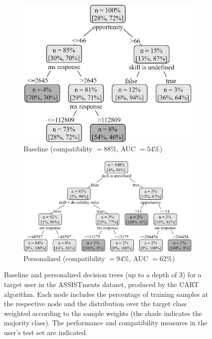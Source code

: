 \documentclass[letterpaper]{article} %
\theoremstyle{definition}
\begin{document}
\begin{figure}[t]
\begin{subfigure}[b]{.4\textwidth}
  \centering
  \includegraphics[width=0.95\linewidth]{assistments_baseline}
  \caption{Baseline (compatibility $=88\%$, AUC $=54\%$)}
  \label{fig:assistments_baseline}
\end{subfigure}
\begin{subfigure}[b]{.6\textwidth}
  \centering
  \includegraphics[width=0.95\linewidth]{assistments_personalized}  
  \caption{Personalized (compatibility $=94\%$, AUC $=62\%$)}
  \label{fig:assistments_personalized}
\end{subfigure}
\caption{Baseline and personalized decision trees (up to a depth of 3) for a target user in the ASSISTments dataset,  produced by the CART algorithm.  Each node includes  the percentage of training samples at the respective node and the distribution over the target class weighted according to the sample weights (the shade indicates the majority class). The performance and compatibility measures in the user's test set are indicated.}
\label{fig:user_case_assistments}
\end{figure}
\end{document}
